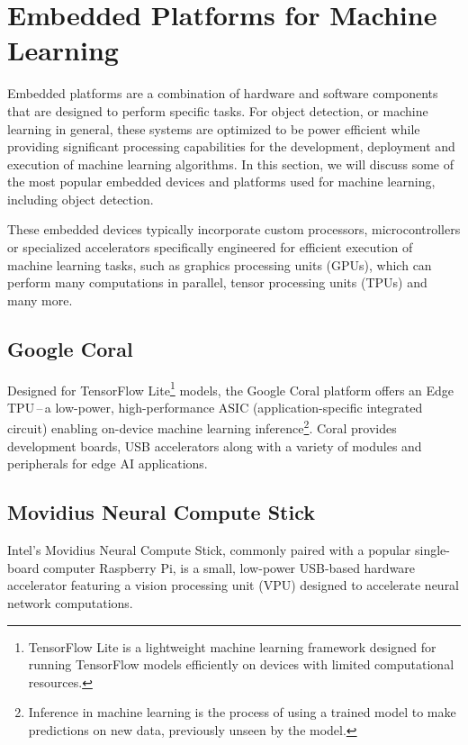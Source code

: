 \section{Embedded Platforms for Machine Learning}

Embedded platforms are a combination of hardware and software components that
are designed to perform specific tasks. For object detection, or machine
learning in general, these systems are optimized to be power efficient while
providing significant processing capabilities for the development, deployment and
execution of machine learning algorithms. In this section, we will discuss some
of the most popular embedded devices and platforms used for machine learning,
including object detection.

These embedded devices typically incorporate custom processors, microcontrollers
or specialized accelerators specifically engineered for efficient execution of
machine learning tasks, such as graphics processing units (GPUs), which can
perform many computations in parallel, tensor processing units (TPUs) and many
more.

\subsection{Google Coral}

Designed for TensorFlow Lite\footnote{TensorFlow Lite is a lightweight machine
learning framework designed for running TensorFlow models efficiently on devices
with limited computational resources.} models, the Google Coral platform offers
an Edge TPU\,--\,a low-power, high-performance ASIC (application-specific
integrated circuit) enabling on-device machine learning
inference\footnote{Inference in machine learning is the process of using a
trained model to make predictions on new data, previously unseen by the model.}.
Coral provides development boards, USB accelerators along with a variety of
modules and peripherals for edge AI applications.


\subsection{Movidius Neural Compute Stick}

Intel's Movidius Neural Compute Stick, commonly paired with a popular
single-board computer Raspberry Pi, is a small, low-power USB-based hardware
accelerator featuring a vision processing unit (VPU) designed to accelerate
neural network computations.


